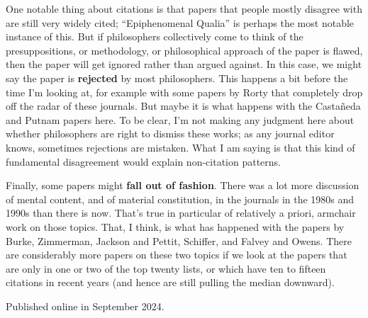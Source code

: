 \documentclass[
  10pt,
  letterpaper,
  DIV=11,
  numbers=noendperiod,
  twoside]{scrartcl}
\begin{document}
One notable thing about citations is that papers that people mostly
disagree with are still very widely cited; ``Epiphenomenal Qualia'' is
perhaps the most notable instance of this. But if philosophers
collectively come to think of the presuppositions, or methodology, or
philosophical approach of the paper is flawed, then the paper will get
ignored rather than argued against. In this case, we might say the paper
is \textbf{rejected} by most philosophers. This happens a bit before the
time I'm looking at, for example with some papers by Rorty that
completely drop off the radar of these journals. But maybe it is what
happens with the Castañeda and Putnam papers here. To be clear, I'm not
making any judgment here about whether philosophers are right to dismiss
these works; as any journal editor knows, sometimes rejections are
mistaken. What I am saying is that this kind of fundamental disagreement
would explain non-citation patterns.

Finally, some papers might \textbf{fall out of fashion}. There was a lot
more discussion of mental content, and of material constitution, in the
journals in the 1980s and 1990s than there is now. That's true in
particular of relatively a priori, armchair work on those topics. That,
I think, is what has happened with the papers by Burke, Zimmerman,
Jackson and Pettit, Schiffer, and Falvey and Owens. There are
considerably more papers on these two topics if we look at the papers
that are only in one or two of the top twenty lists, or which have ten
to fifteen citations in recent years (and hence are still pulling the
median downward).



\noindent Published online in September 2024.
\end{document}
